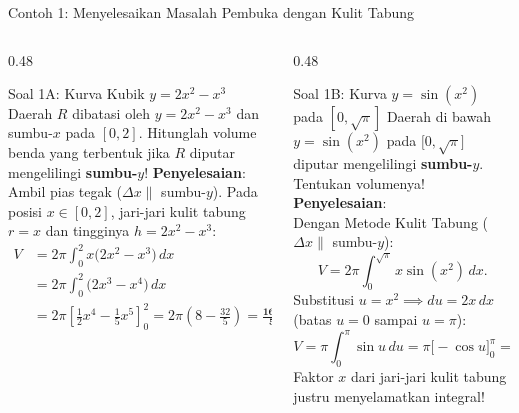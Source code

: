 \documentclass[aspectratio=43,10pt]{beamer}
\begin{document}
\begin{frame}{Contoh 1: Menyelesaikan Masalah Pembuka dengan Kulit Tabung}
    \begin{columns}[T]
        \begin{column}{0.48\textwidth}
            \begin{exampleblock}{Soal 1A: Kurva Kubik $y = 2x^2 - x^3$}
                \scriptsize\abovedisplayskip=2pt\belowdisplayskip=2pt
                Daerah $R$ dibatasi oleh $y = 2x^2 - x^3$ dan sumbu-$x$ pada $[0, 2]$. Hitunglah volume benda yang terbentuk jika $R$ diputar mengelilingi \textbf{sumbu-$y$}!
                \vskip 3pt
                \textbf{Penyelesaian}:\\
                Ambil pias tegak ($\Delta x \parallel$ sumbu-$y$). Pada posisi $x \in [0, 2]$, jari-jari kulit tabung $r = x$ dan tingginya $h = 2x^2 - x^3$:
                \begin{align*}
                    V &= 2\pi\int_{0}^{2} x\big(2x^2 - x^3\big)\,dx\\
                    &= 2\pi\int_{0}^{2} \big(2x^3 - x^4\big)\,dx\\
                    &= 2\pi\left[\frac{1}{2}x^4 - \frac{1}{5}x^5\right]_{0}^{2} = 2\pi\!\left(8 - \frac{32}{5}\right) = \mathbf{\frac{16\pi}{5}}.
                \end{align*}
            \end{exampleblock}
        \end{column}

        \begin{column}{0.48\textwidth}
            \begin{block}{Soal 1B: Kurva $y = \sin(x^2)$ pada $[0, \sqrt{\pi}]$}
                \scriptsize\abovedisplayskip=2pt\belowdisplayskip=2pt
                Daerah di bawah $y = \sin(x^2)$ pada $\big[0, \sqrt{\pi}\big]$ diputar mengelilingi \textbf{sumbu-$y$}. Tentukan volumenya!
                \vskip 3pt
                \textbf{Penyelesaian}:\\
                Dengan Metode Kulit Tabung ($\Delta x \parallel$ sumbu-$y$):
                $$V = 2\pi\int_{0}^{\sqrt{\pi}} x\sin(x^2)\,dx.$$
                Substitusi $u = x^2 \implies du = 2x\,dx$ (batas $u = 0$ sampai $u = \pi$):
                $$V = \pi\int_{0}^{\pi} \sin u\,du = \pi\big[-\cos u\big]_{0}^{\pi} = \mathbf{2\pi}.$$
                {\tiny\color{TealCyan}Faktor $x$ dari jari-jari kulit tabung justru menyelamatkan integral!}
            \end{block}
        \end{column}
    \end{columns}
\end{frame}
\end{document}
